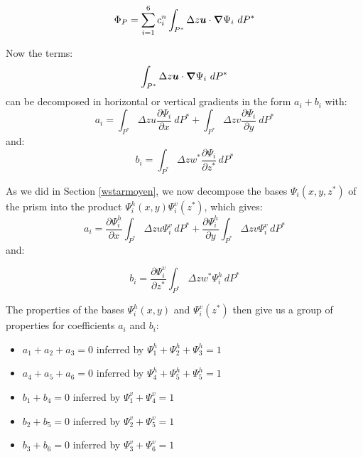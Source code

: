 \begin{equation}
\Phi_{P}=\sum\limits_{i=1}^{6}c_{i}^{n}\int\nolimits_{P^{\ast}}\Delta
z\vec{u}\cdot\Grad\Psi_{i}~dP^{\ast}%
\end{equation}

Now the terms:%
\begin{equation}
\int\nolimits_{P^{\ast}}\Delta z\vec{u}\cdot\Grad\Psi_{i}~dP^{\ast}%
\end{equation}
can be decomposed in horizontal or vertical gradients in the form $a_{i}%
+b_{i}$ with:
\begin{equation}
a_{i}=\int\nolimits_{P^{\ast}}\Delta z u\dfrac{\partial\Psi_{i}}{\partial
x}~dP^{\ast}+\int\nolimits_{P^{\ast}}\Delta z v\dfrac{\partial\Psi_{i}%
}{\partial y}~dP^{\ast}%
\end{equation}
and:%
\begin{equation}
b_{i}=\int\nolimits_{P^{\ast}}\Delta zw^{\ast}\dfrac{\partial\Psi_{i}}{\partial
z^{\ast}}\,dP^{\ast}%
\end{equation}

As we did in Section \ref{wstarmoyen}, we now decompose the bases $\Psi
_{i}(x,y,z^{\ast})$ of the prism into the product $\Psi_{i}^{h}(x,y)\Psi
_{i}^{v}(z^{\ast})$, which gives:%
\begin{equation}
a_{i}=\dfrac{\partial\Psi_{i}^{h}}{\partial x}\int\nolimits_{P^{\ast}}\Delta
z u\Psi_{i}^{v}\,dP^{\ast}+\dfrac{\partial\Psi_{i}^{h}}{\partial y}%
\int\nolimits_{P^{\ast}}\Delta z v\Psi_{i}^{v}\,dP^{\ast}%
\end{equation}
and:%

\begin{equation}
b_{i}=\dfrac{\partial\Psi_{i}^{v}}{\partial z^{\ast}}\int\nolimits_{P^{\ast}%
}\Delta zw^{\ast}\Psi_{i}^{h}\,dP^{\ast}%
\end{equation}

The properties of the bases $\Psi_{i}^{h}(x,y)$ and $\Psi_{i}^{v}(z^{\ast})$
then give us a group of properties for coefficients $a_{i}$ and $b_{i}$:

\begin{itemize}
\item $a_{1}+a_{2}+a_{3}=0$ inferred by $\Psi_{1}^{h}+\Psi_{2}^{h}+\Psi
_{3}^{h}=1$

\item $a_{4}+a_{5}+a_{6}=0$ inferred by $\Psi_{4}^{h}+\Psi_{5}^{h}+\Psi
_{5}^{h}=1$

\item $b_{1}+b_{4}=0$ inferred by $\Psi_{1}^{v}+\Psi_{4}^{v}=1$

\item $b_{2}+b_{5}=0$ inferred by $\Psi_{2}^{v}+\Psi_{5}^{v}=1$

\item $b_{3}+b_{6}=0$ inferred by $\Psi_{3}^{v}+\Psi_{6}^{v}=1$
\end{itemize}

